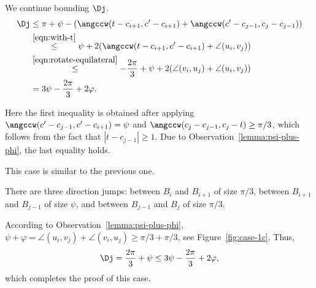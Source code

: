 \begin{enumerate}[label={\bf Case \arabic*: }, wide, labelwidth=!, labelindent=0pt]
We continue bounding $\Dj$.
\begin{align*}
\Dj & \leq \pi + \psi - (\angccw(t - c_{i+1}, c' - c_{i+1}) + \angccw(c' - c_{j-1}, c_j - c_{j-1})) \\
& \stackrel{\eqref{eqn:with-t}}{\leq} \psi + 2(\angccw(t - c_{i+1}, c' - c_{i+1}) + \angle(u_i, v_j)) \\
& \stackrel{\eqref{eqn:rotate-equilateral}}{\leq} -\frac{2\pi}{3} + \psi + 2(\angle(v_i, u_j) + \angle(u_i, v_j)) \\
& = 3\psi - \frac{2\pi}{3} + 2\varphi.
\end{align*}

Here the first inequality is obtained after applying $\angccw(c' - c_{j-1}, c' - c_{i+1}) = \psi$ and $\angccw(c_j - c_{j-1}, c_j - t)\geq\pi/3$, which follows from the fact that $|t - c_{j-1}|\geq 1$. Due to Observation~\ref{lemma:psi-plus-phi}, the last equality holds.


This case is similar to the previous one.


There are three direction jumps: between $B_i$ and $B_{i+1}$ of size $\pi/3$, between $B_{i+1}$ and $B_{j-1}$ of size $\psi$, and between $B_{j-1}$ and $B_j$ of size $\pi/3$.

According to Observation~\ref{lemma:psi-plus-phi}, $\psi + \varphi = \angle(u_i, v_j) + \angle(v_i, u_j) \ge \pi/3 + \pi/3$, see Figure~\ref{fig:case-1c}. Thus,
$$\Dj = \frac{2\pi}{3} + \psi \leq 3\psi - \frac{2\pi}{3} + 2\varphi,$$
which completes the proof of this case.



\end{enumerate}
